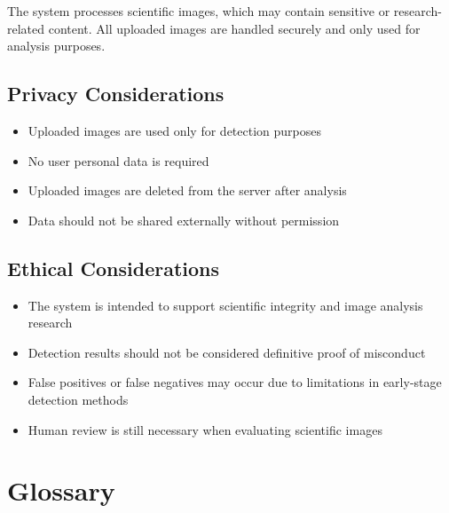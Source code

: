 \documentclass[12pt]{article}
\begin{document}
The system processes scientific images, which may contain sensitive or
research-related content. All uploaded images are handled securely and only used for
analysis purposes.

\subsection{Privacy Considerations}

\begin{itemize}
    \item Uploaded images are used only for detection purposes
    \item No user personal data is required
    \item Uploaded images are deleted from the server after analysis
    \item Data should not be shared externally without permission
\end{itemize}

\subsection{Ethical Considerations}

\begin{itemize}
    \item The system is intended to support scientific integrity and image analysis research
    \item Detection results should not be considered definitive proof of misconduct
    \item False positives or false negatives may occur due to limitations in early-stage detection methods
    \item Human review is still necessary when evaluating scientific images
\end{itemize}

\section{Glossary}
\end{document}
